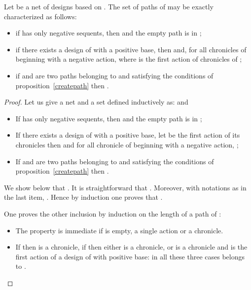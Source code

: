 \documentclass{LMCS}
\begin{document}
\begin{prop}\label{prop:characSetOfPaths}
Let  be a net of designs based on .
The set of paths  of  may be exactly
characterized as follows:
\begin{itemize}[label=]
\item if  has only negative sequents, then  and the empty path is in ;
\item if there exists a design  of  with a positive base, then  and, for all chronicles  of  beginning with a negative action,  where  is the first action of chronicles of ;
\item if  and  are two paths belonging to  and satisfying the conditions of proposition~\ref{createpath} then
.
\end{itemize}
\end{prop}
\begin{proof}
Let us give a net  and a set  defined inductively as:
 and
\begin{itemize}[label=]
\item If  has only negative sequents, then  and the empty path is in ;
\item If there exists a design  of  with a positive base, 
let  be the first action of its chronicles 
then  and for all chronicle  of  beginning with a negative action,  ;
\item If  and  are two paths belonging to  and satisfying the conditions of proposition~\ref{createpath} then
.
\end{itemize}

\noindent We show below that .
It is straightforward that . Moreover, with notations as in the last item,
. Hence by induction one proves that .

One proves the other inclusion by induction on the length of a path
 of :
\begin{itemize}[label=]
 \item The property is immediate if  is empty, a single action or a chronicle.
 \item If  then  is a
   chronicle, if  then either
    is a chronicle, or  is a chronicle and
    is the first action of a design of  with
   positive base: in all these three cases  belongs to
   .


\end{itemize}
\end{proof}
\end{document}
